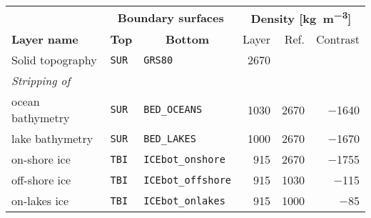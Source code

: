 \begingroup\setlength{\fboxsep}{0pt}
\colorbox{tablebackground}{%
\begin{tabular}{lllrrr}
    \toprule   
    {} & \multicolumn{2}{c}{\textbf{Boundary surfaces}}  & \multicolumn{3}{c}{\textbf{Density [\si{\kilo \gram \per \cubic \metre}]}}\\
        \cmidrule{2-3}
        \cmidrule{4-6}
        \textbf{Layer name} & \multicolumn{1}{c}{\textbf{Top}} & \multicolumn{1}{c}{\textbf{Bottom}} & Layer & Ref. & Contrast \\
    \midrule
    Solid topography &
    \texttt{SUR} & \texttt{GRS80} &
    \num{2670} & & \\

    \textit{Stripping of} & & & & \\

    \quad ocean bathymetry &
    \texttt{SUR} & \texttt{BED\_OCEANS} &
    \num{1030} & \num{2670} & \num{-1640} \\

    \quad lake bathymetry &
    \texttt{SUR} & \texttt{BED\_LAKES} &
    \num{1000} & \num{2670} & \num{-1670} \\

    \quad on-shore ice &
    \texttt{TBI} & \texttt{ICEbot\_onshore} &
    \num{915} & \num{2670} & \num{-1755} \\

    \quad off-shore ice &
    \texttt{TBI} & \texttt{ICEbot\_offshore} &
    \num{915} & \num{1030} & \num{-115} \\

    \quad on-lakes ice &
    \texttt{TBI} & \texttt{ICEbot\_onlakes} &
    \num{915} & \num{1000} & \num{-85} \\
    \bottomrule
\end{tabular}
}\endgroup
